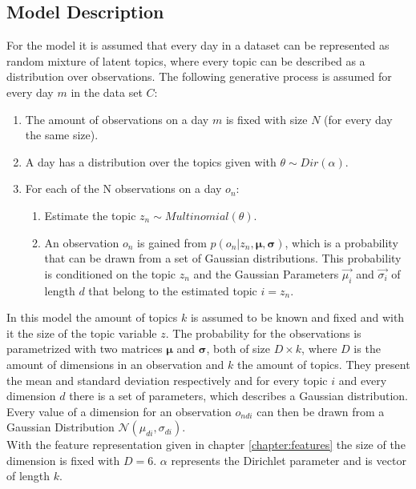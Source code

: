 
  \subsection{Model Description}
  
  For the model it is assumed that every day in a dataset can be represented as random mixture of latent topics, where every topic can be described as a distribution over observations. The following generative process is assumed for every day $m$ in the data set $C$:
\begin{enumerate}
 \item The amount of observations on a day $m$ is fixed with size $N$ (for every day the same size).
 \item A day has a distribution over the topics given with $\theta \sim Dir(\alpha)$.
 \item For each of the N observations on a day $o_n$:
 
 \begin{enumerate}
  \item Estimate the topic $z_n \sim Multinomial(\theta)$.
  \item An observation $o_n$ is gained from $p(o_n |z_n,\boldsymbol\mu,\boldsymbol\sigma)$,  which is a probability that can be drawn from a set of Gaussian distributions. This probability is conditioned on the topic $z_n$ and the Gaussian Parameters $\vec{\mu_i}$ and $\vec{\sigma_i}$ of length $d$ that belong to the estimated topic $i=z_n$.
 \end{enumerate}

\end{enumerate}
  
In this model the amount of topics $k$ is assumed to be known and fixed and with it the size of the topic variable $z$.
The probability for the observations is parametrized with two matrices $\boldsymbol\mu$ and $\boldsymbol\sigma$, both of size $D\times k$, where $D$ is the amount of dimensions in an observation and $k$ the amount of topics. They present the mean and standard deviation respectively and for every topic $i$ and every dimension $d$ there is a set of parameters, which describes a Gaussian distribution. Every value of a dimension for an observation $o_{ndi}$ can then be drawn from a Gaussian Distribution $\mathcal{N}(\mu_{di},\sigma_{di})$.\\
With the feature representation given in chapter \ref{chapter:features} the size of the dimension is fixed with $D=6$. $\alpha$ represents the Dirichlet parameter and is vector of length $k$.

